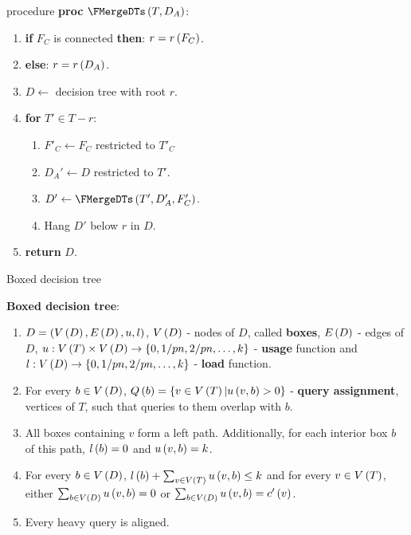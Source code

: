 % 
\begin{frame}{\FMergeDTs procedure}
\textbf{proc} $\FMergeDTs\br{T, D_A}$:
\begin{enumerate}
    \item \textbf{if} $F_C$ is connected \textbf{then}: $r=r\left( F_C \right)$.
    \item \textbf{else}: $r=r\left( D_A \right)$.
    \item $D\gets$ decision tree with root $r$.
    \item \textbf{for} $T'\in T-r$:
    \begin{enumerate}
        \item $F'_C \gets F_C$ restricted to $T'_C$
        \item $D_A'\gets D$ restricted to $T'$.
        \item $D'\gets \FMergeDTs\br{T', D_A', F'_C}$.
        \item Hang $D'$ below $r$ in $D$.
    \end{enumerate}  
    \item \textbf{return} $D$.
\end{enumerate}
\end{frame}
\begin{frame}{Boxed decision tree}
    \begin{definition}
        \textbf{Boxed decision tree}:
        \begin{enumerate}
        \item $D=\left( V\left( D \right), E\left( D \right), u, l \right)$, $V\left( D \right)$ - nodes of $D$, called \textbf{boxes}, $E\left( D \right)$ - edges of $D$, $u:V\left( T \right)\times V\left( D \right)\to \left\{ 0, 1/pn,2/pn,\dots,k \right\}$ - \textbf{usage} function and $l:V\left( D \right)\to\left\{ 0, 1/pn,2/pn,\dots,k \right\}$ - \textbf{load} function.
        \pause
        \item For every $b\in V\left( D \right)$, $Q\left( b \right)=\left\{ v\in V\left( T \right)|u\left( v,b \right)>0 \right\}$ - \textbf{query assignment}, vertices of $T$, such that queries to them overlap with $b$.
        \pause
        \item All boxes containing $v$ form a left path. Additionally, for each interior box $b$ of this path, $l\left( b \right)=0$ and $u\left( v,b \right)=k$.
        \pause
        \item For every $b\in V\left( D \right)$, $l\left( b \right)+\sum_{v\in V\left( T \right)}u\left( v,b \right)\leq k$ and for every $v\in V\left( T \right)$, either $\sum_{b\in V\left( D \right)}u\left( v,b \right)=0$ or $\sum_{b\in V\left( D \right)}u\left( v,b \right)=c'\left( v \right)$.
        \pause
        \item Every heavy query is aligned.
        \end{enumerate}  
    \end{definition}
\end{frame}
